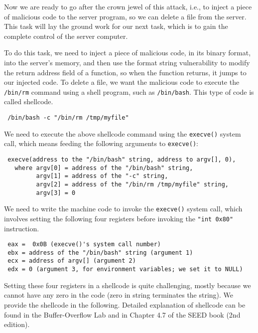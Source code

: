 Now we are ready to go after the crown jewel of this attack, i.e., to
inject a piece of malicious code to the server program, so we can delete 
a file from the server. This task will 
lay the ground work for our next task, which is to gain the complete control
of the server computer. 

To do this task, we need to inject a piece of malicious code, in its binary format, 
into the server's memory, and then use the format string vulnerability 
to modify the return address field of a function, so when the function returns, 
it jumps to our injected code. To delete a file, we want the 
malicious code to execute the \texttt{/bin/rm} command using a shell
program, such as \texttt{/bin/bash}. This type of code is called 
shellcode. 

\begin{lstlisting}
 /bin/bash -c "/bin/rm /tmp/myfile"
\end{lstlisting}
 
We need to execute the above shellcode command using the 
\texttt{execve()} system call, which means 
feeding the following arguments to \texttt{execve()}:

\begin{lstlisting}
 execve(address to the "/bin/bash" string, address to argv[], 0), 
   where argv[0] = address of the "/bin/bash" string,
         argv[1] = address of the "-c" string,
         argv[2] = address of the "/bin/rm /tmp/myfile" string,
         argv[3] = 0
\end{lstlisting}
 
We need to write the machine code to invoke the \texttt{execve()} 
system call, which involves setting the following four
registers before invoking the \texttt{"int 0x80"} instruction.  

\begin{lstlisting}
 eax =  0x0B (execve()'s system call number)
 ebx = address of the "/bin/bash" string (argument 1)
 ecx = address of argv[] (argument 2)
 edx = 0 (argument 3, for environment variables; we set it to NULL)
\end{lstlisting}


Setting these four registers in a shellcode is quite challenging, mostly
because we cannot have any zero in the code (zero in string terminates
the string).  We provide 
the shellcode in the following. Detailed explanation of shellcode can be found 
in the Buffer-Overflow Lab and in Chapter 4.7 of the SEED book (2nd edition).


